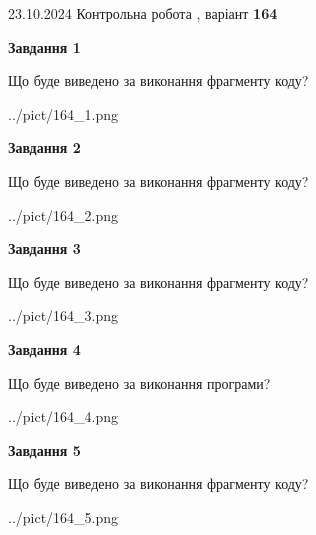 \documentclass[12pt, ukrainian]{article}
\begin{document}
{\Large{23.10.2024 Контрольна робота , варіант  \No \textbf { 164 }\par}}
{
\begin {large}
{\begin {center}\textbf{Завдання 1}\end {center}}

Що буде виведено за виконання фрагменту коду?\par
\begin{center}
	{../pict/164_1.png}
\end{center}
\newpage

{\begin {center}\textbf{Завдання 2}\end {center}}

Що буде виведено за виконання фрагменту коду?\par
\begin{center}
	{../pict/164_2.png}
\end{center}
\newpage

{\begin {center}\textbf{Завдання 3}\end {center}}

Що буде виведено за виконання фрагменту коду?\par
\begin{center}
	{../pict/164_3.png}
\end{center}
\newpage

{\begin {center}\textbf{Завдання 4}\end {center}}

Що буде виведено за виконання програми?\par
\begin{center}
	{../pict/164_4.png}
\end{center}
\newpage

{\begin {center}\textbf{Завдання 5}\end {center}}

Що буде виведено за виконання фрагменту коду?\par
\begin{center}
	{../pict/164_5.png}
\end{center}
\newpage


\end{large}}
\end{document}
